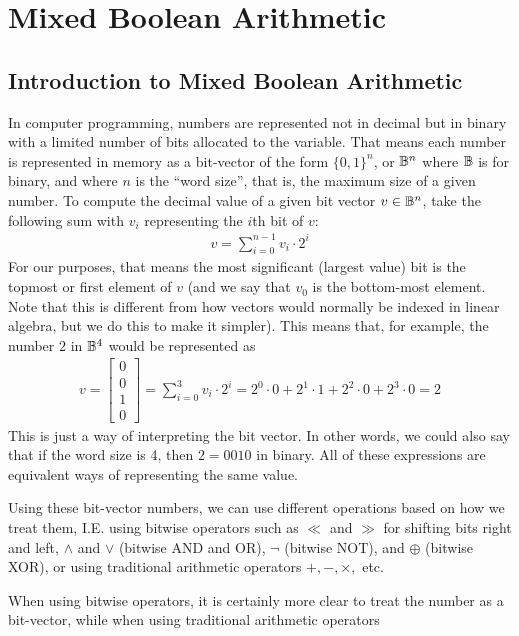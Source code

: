 \section{Mixed Boolean Arithmetic}
\subsection{Introduction to Mixed Boolean Arithmetic}
In computer programming, numbers are represented
not in decimal but in binary with a limited number of bits allocated to the 
variable. That means each number is represented in memory as a bit-vector of
the form $\{0,1\}^n$, or $\mathbb{B}^n$ where $\mathbb{B}$ is for binary, and where $n$ is the ``word size'', that is, the maximum 
size of a given number. To compute the decimal value of a given bit vector $v \in \mathbb{B}^n$, 
take the following sum with $v_i$ representing the $i$th bit of $v$:
\begin{align*}
    v = \sum_{i = 0}^{n-1} v_i \cdot 2^{i}
\end{align*}
For our purposes, that means the most significant (largest value) bit is the topmost
or first element of $v$ (and we say that $v_0$ is the bottom-most element. Note that
this is different from how vectors would normally be indexed in linear algebra, but we
do this to make it simpler).
This means that, for example, the number $2$ in $\mathbb{B}^4$ would be represented as 
\begin{align*}
    v = \begin{bmatrix}
        0 \\ 0 \\1 \\0
    \end{bmatrix} = \sum_{i=0}^{3}v_i \cdot 2^{i} = 2^0 \cdot 0 + 2^1 \cdot 1 + 2^2 \cdot 0 + 2^3 \cdot 0 = 2
\end{align*}
This is just a way of interpreting the bit vector. In other words, we could also say that 
if the word size is 4, then $2 = 0010$ in binary. All of these expressions are
equivalent ways of representing the same value.
\par Using these bit-vector numbers, we can use different
operations based on how we treat them, I.E. using bitwise operators such as
$\ll$ and $\gg$ for shifting bits right and left, $\land$ and $\lor$ (bitwise AND and OR), $\neg$ (bitwise NOT), 
and $\oplus$ (bitwise XOR), or using traditional arithmetic operators $+, -, \times,$ etc.
\par When using bitwise operators, it is certainly more clear to treat the 
number as a bit-vector, while when using traditional arithmetic operators
